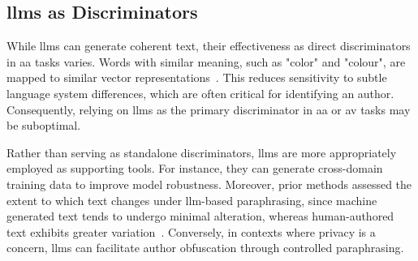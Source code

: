 \subsection{\acsp{llm} as Discriminators}
\label{sec:llm_discriminator}

While \acp{llm} can generate coherent text, their effectiveness as direct discriminators in \ac{aa} tasks varies. 
Words with similar meaning, such as "color" and "colour", are mapped to similar vector representations~\citep{altakrori_topic_2021}.
This reduces sensitivity to subtle language system differences, which are often critical for identifying an author. 
Consequently, relying on \acp{llm} as the primary discriminator in \ac{aa} or \ac{av} tasks may be suboptimal.

Rather than serving as standalone discriminators, \acp{llm} are more appropriately employed as supporting tools. 
For instance, they can generate cross-domain training data to improve model robustness. 
Moreover, prior methods assessed the extent to which text changes under \ac{llm}-based paraphrasing, since machine generated text tends to undergo minimal alteration, whereas human-authored text exhibits greater variation~\citep{mao_raidar_2024}.
Conversely, in contexts where privacy is a concern, \acp{llm} can facilitate author obfuscation through controlled paraphrasing. 